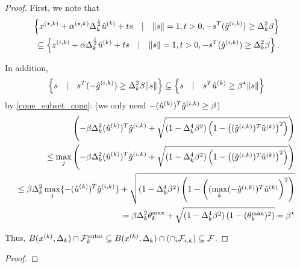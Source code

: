 \begin{proof}
First, we note that
\begin{align*}
\left \{{x^{(\star, k)}} + {\alpha^{(\star, k)}}\Delta_k^{\frac 1 2}{{\hat u}^{(k)}}  + t s\quad | \quad \|s\| = 1, t> 0, -s^T({{\hat g}^{(i, k)}})\ge\Delta_k^2\beta \right\} \\
\subseteq \left \{{z^{(i, k)}} + \alpha\Delta_k^{\frac 1 2}{{\hat u}^{(k)}} + t s\quad | \quad \|s\| = 1, t> 0, -s^T({{\hat g}^{(i, k)}})\ge\Delta_k^2\beta \right\}.  \\
\end{align*}

In addition,
\begin{align*}
\left\{s\quad | \quad s^T(-{{\hat g}^{(i, k)}})\ge\Delta_k^2\beta\|s\| \right\}  \subseteq \left\{s\quad | \quad s^T{{\hat u}^{(k)}}\ge\beta^{\star}\|s\| \right\}
\end{align*}
by \cref{cone_subset_cone}: (\color{red}we only need $-({{\hat u}^{(k)}})^T{{\hat g}^{(i, k)}} \ge \beta$\color{black})
\begin{align*}
\left(-\beta\Delta_k^2({{\hat u}^{(k)}})^T{{\hat g}^{(i, k)}} + \sqrt{(1 - \Delta_k^4\beta^2)\left(1 - \left(({{\hat g}^{(i, k)}})^T\hat u^{(k)}\right)^2\right)}\right) \\
\le \max_j \left(-\beta\Delta_k^2({{\hat u}^{(k)}})^T{{{\hat g}^{(i, k)}}} + \sqrt{(1 - \Delta_k^4\beta^2)\left(1 - \left(({{\hat g}^{(i, k)}})^T{{\hat u}^{(k)}}\right)^2\right)}\right) \\
\le \beta\Delta_k^2 \max_j\{-({{\hat u}^{(k)}})^T{{\hat g}^{(i, k)}}\} + \sqrt{(1 - \Delta_k^4\beta^2)\left(1 - \left((\max_k(-{{\hat g}^{(i, k)}})^T{{\hat u}^{(k)}}\right)^2\right)} \\
= \beta\Delta_k^2 \theta^{\text{max}}_k + \sqrt{(1 - \Delta_k^4\beta^2)\left(1 - (\theta^{\text{max}}_k) ^2\right)} = \beta^{\star}
\end{align*}

Thus, $B({x^{(k)}}, \Delta_k) \cap {\mathcal {F}^{\text{outer}}_k} \subseteq B({x^{(k)}}, \Delta_k) \cap \left(\cap_i {\mathcal F_{i, k}} \right)\subseteq {\mathcal F}$.
\end{proof}

\begin{theorem}
\end{theorem}

\begin{proof}

\end{proof}


\color{red}
\begin{theorem}
\end{theorem}

